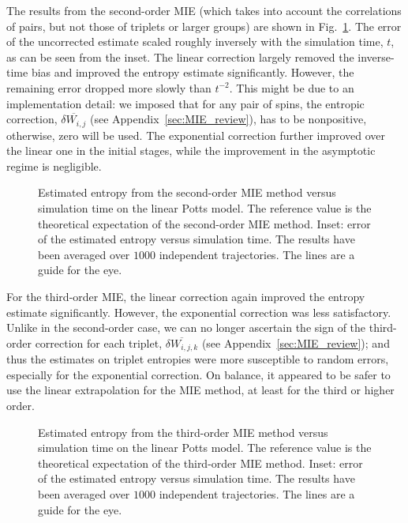 \documentclass[reprint, superscriptaddress]{revtex4-1}
\begin{document}
The results from the second-order MIE
(which takes into account the correlations of pairs,
but not those of triplets or larger groups)
are shown in Fig.~\ref{fig:potts_mie2nd}.
%
The error of the uncorrected estimate
scaled roughly inversely with the simulation time, $t$,
as can be seen from the inset.
%
The linear correction largely removed the inverse-time bias
and improved the entropy estimate significantly.
%
However, the remaining error dropped more slowly than $t^{-2}$.
%
This might be due to an implementation detail:
we imposed that for any pair of spins,
the entropic correction,
$\overline{ \delta W_{i, j} }$ (see Appendix~\ref{sec:MIE_review}),
has to be nonpositive,
otherwise, zero will be used.
%
The exponential correction further improved over
the linear one in the initial stages,
while the improvement in the asymptotic regime is negligible.
%

\begin{figure}[h]\centering
  \caption{
    \label{fig:potts_mie2nd}
    Estimated entropy from the second-order MIE method
    versus simulation time on the linear Potts model.
    The reference value is the theoretical expectation
    of the second-order MIE method.
    Inset: error of the estimated entropy
    versus simulation time.
    The results have been averaged over $1000$ independent trajectories.
    The lines are a guide for the eye.
  }
\end{figure}


For the third-order MIE,
the linear correction again improved the entropy estimate
significantly.
However, the exponential correction was less satisfactory.
%
Unlike in the second-order case,
we can no longer ascertain the sign of
the third-order correction for each triplet,
$\overline{ \delta W_{i, j, k} }$ (see Appendix~\ref{sec:MIE_review});
and thus the estimates on triplet entropies
were more susceptible to random errors,
especially for the exponential correction.
%
On balance, it appeared to be safer
to use the linear extrapolation for the MIE method,
at least for the third or higher order.

\begin{figure}[h]\centering
  \caption{
    \label{fig:potts_mie3rd}
    Estimated entropy from the third-order MIE method
    versus simulation time on the linear Potts model.
    The reference value is the theoretical expectation
    of the third-order MIE method.
    Inset: error of the estimated entropy
    versus simulation time.
    The results have been averaged over $1000$ independent trajectories.
    The lines are a guide for the eye.
  }
\end{figure}
\end{document}
